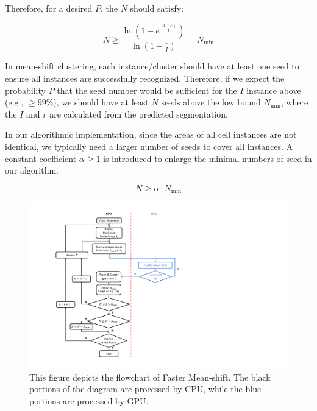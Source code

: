 \documentclass[journal,twoside,web]{ieeecolor}
\begin{document}
Therefore, for a desired $P$, the $N$ should satisfy:

\begin{equation}
N \ge \frac{{\ln \left( {1 - {e^{\frac{{\ln (P)}}{I}}}} \right)}}{{\ln \left( {1 - \frac{r}{{I}}} \right)}} = {N_{\min }}
\label{eq19}
\end{equation}

In mean-shift clustering, each instance/cluster should have at least one seed to ensure all instances are successfully recognized. Therefore, if we expect the probability $P$ that the seed number would be sufficient for the $I$ instance above (e.g., $\ge 99\%$), we should have at least $N$ seeds above the low bound $N_{\min }$, where the $I$ and $r$ are calculated from the predicted segmentation. 

In our algorithmic implementation, since the areas of all cell instances are not identical, we typically need a larger number of seeds to cover all instances. A constant coefficient $\alpha \ge 1$ is introduced to enlarge the minimal numbers of seed in our algorithm.

\begin{equation}
N \ge \alpha \cdot {N_{\min }}
\label{eq20}
\end{equation}



\begin{figure}[h]
\centerline{\includegraphics[width=\columnwidth]{3.pdf}}
\caption{This figure depicts the flowchart of Faster Mean-shift. The black  portions of the diagram are processed by CPU, while the blue portions are processed by GPU.}
\label{fig3}
\end{figure}
\end{document}
